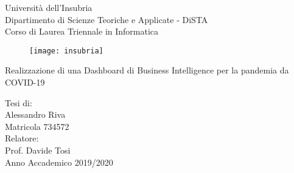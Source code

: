 \begin{titlepage}
  \begin{center}
  \begin{large}
  {\fontsize{20}{18}\selectfont\vspace*{0.50cm}Università dell'Insubria}\\
  \vspace{.1cm}
  Dipartimento di Scienze Teoriche e Applicate - DiSTA\\
  \vspace{.1cm}
  Corso di Laurea Triennale in Informatica
  \end{large}
  
  \vspace{1cm}
  \begin{figure}[h]
    \begin{center}
      \texttt{[image: insubria]}
    \end{center}
  \end{figure}

    {\fontsize{25}{25}\selectfont\par
    Realizzazione di una Dashboard di Business Intelligence per la pandemia da COVID-19}
    \par    
    \vspace{2.4cm}
    \begin{large}
    Tesi di:\\
    Alessandro Riva\\
    Matricola 734572\\
    \vspace{2.3cm}
    Relatore:\\
    Prof. Davide Tosi\\
    \vfill
    Anno Accademico 2019/2020
    \end{large}
    

  \end{center}
\end{titlepage}